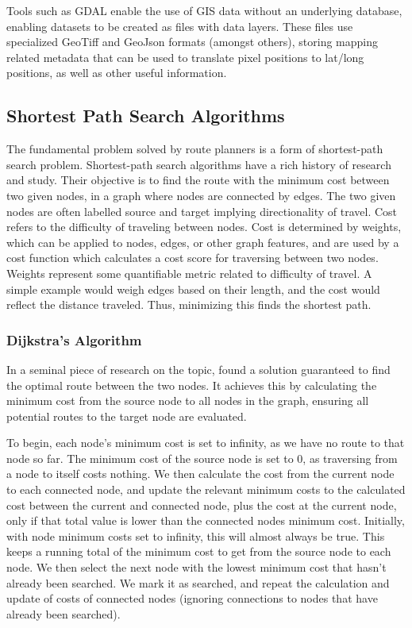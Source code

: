 \documentclass[12pt]{article}
\begin{document}
Tools such as GDAL enable the use of GIS data without an underlying database, enabling datasets to be created as files with data layers. These  files use specialized GeoTiff and GeoJson formats (amongst others), storing mapping related metadata that can be used to translate pixel positions to lat/long positions, as well as other useful information.


\subsection{Shortest Path Search Algorithms}

The fundamental problem solved by route planners is a form of shortest-path search problem. Shortest-path search algorithms have a rich history of research and study. Their objective is to find the route with the minimum cost between two given nodes, in a graph where nodes are connected by edges. The two given nodes are often labelled source and target implying directionality of travel. Cost refers to the difficulty of traveling between nodes. Cost is determined by weights, which can be applied to nodes, edges, or other graph features, and are used by a cost function which calculates a cost score for traversing between two nodes. Weights represent some quantifiable metric related to difficulty of travel. A simple example would weigh edges based on their length, and the cost would reflect the distance traveled. Thus, minimizing this finds the shortest path.

\subsubsection{Dijkstra's Algorithm}

In a seminal piece of research on the topic, \textcite{dijkstra1959} found a solution guaranteed to find the optimal route between the two nodes. It achieves this by calculating the minimum cost from the source node to all nodes in the graph, ensuring all potential routes to the target node are evaluated.

To begin, each node's minimum cost is set to infinity, as we have no route to that node so far. The minimum cost of the source node is set to 0, as traversing from a node to itself costs nothing. We then calculate the cost from the current node to each connected node, and update the relevant minimum costs to the calculated cost between the current and connected node, plus the cost at the current node, only if that total value is lower than the connected nodes minimum cost. Initially, with node minimum costs set to infinity, this will almost always be true. This keeps a running total of the minimum cost to get from the source node to each node. We then select the next node with the lowest minimum cost that hasn't already been searched. We mark it as searched, and repeat the calculation and update of costs of connected nodes (ignoring connections to nodes that have already been searched).
\end{document}
